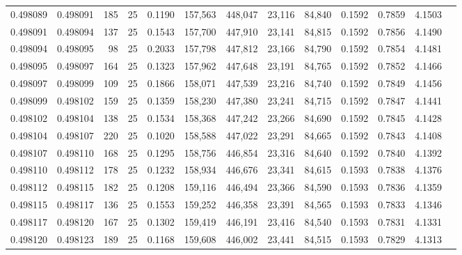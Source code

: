 \begin{tabular}{rrrrrrrrrrrrr}
0.498089 & 0.498091 & 185 &  25 &                                     0.1190 & 157,563 & 448,047 &  23,116 &  84,840 & 0.1592 & 0.7859 & 4.1503 \\
0.498091 & 0.498094 & 137 &  25 &                                     0.1543 & 157,700 & 447,910 &  23,141 &  84,815 & 0.1592 & 0.7856 & 4.1490 \\
0.498094 & 0.498095 &  98 &  25 &                                     0.2033 & 157,798 & 447,812 &  23,166 &  84,790 & 0.1592 & 0.7854 & 4.1481 \\
0.498095 & 0.498097 & 164 &  25 &                                     0.1323 & 157,962 & 447,648 &  23,191 &  84,765 & 0.1592 & 0.7852 & 4.1466 \\
0.498097 & 0.498099 & 109 &  25 &                                     0.1866 & 158,071 & 447,539 &  23,216 &  84,740 & 0.1592 & 0.7849 & 4.1456 \\
0.498099 & 0.498102 & 159 &  25 &                                     0.1359 & 158,230 & 447,380 &  23,241 &  84,715 & 0.1592 & 0.7847 & 4.1441 \\
0.498102 & 0.498104 & 138 &  25 &                                     0.1534 & 158,368 & 447,242 &  23,266 &  84,690 & 0.1592 & 0.7845 & 4.1428 \\
0.498104 & 0.498107 & 220 &  25 &                                     0.1020 & 158,588 & 447,022 &  23,291 &  84,665 & 0.1592 & 0.7843 & 4.1408 \\
0.498107 & 0.498110 & 168 &  25 &                                     0.1295 & 158,756 & 446,854 &  23,316 &  84,640 & 0.1592 & 0.7840 & 4.1392 \\
0.498110 & 0.498112 & 178 &  25 &                                     0.1232 & 158,934 & 446,676 &  23,341 &  84,615 & 0.1593 & 0.7838 & 4.1376 \\
0.498112 & 0.498115 & 182 &  25 &                                     0.1208 & 159,116 & 446,494 &  23,366 &  84,590 & 0.1593 & 0.7836 & 4.1359 \\
0.498115 & 0.498117 & 136 &  25 &                                     0.1553 & 159,252 & 446,358 &  23,391 &  84,565 & 0.1593 & 0.7833 & 4.1346 \\
0.498117 & 0.498120 & 167 &  25 &                                     0.1302 & 159,419 & 446,191 &  23,416 &  84,540 & 0.1593 & 0.7831 & 4.1331 \\
0.498120 & 0.498123 & 189 &  25 &                                     0.1168 & 159,608 & 446,002 &  23,441 &  84,515 & 0.1593 & 0.7829 & 4.1313 \\

\end{tabular}
